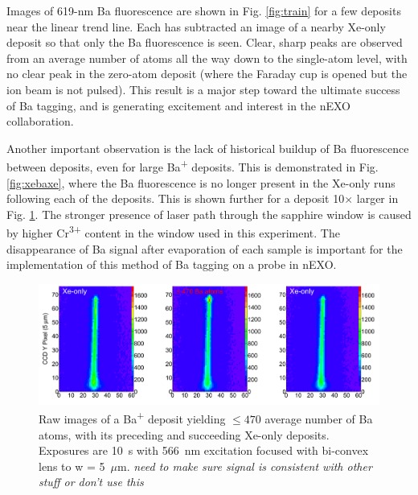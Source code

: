 Images of 619-nm Ba fluorescence are shown in Fig. \ref{fig:train} for a few deposits near the linear trend line.  Each has subtracted an image of a nearby Xe-only deposit so that only the Ba fluorescence is seen.  Clear, sharp peaks are observed from an average number of atoms all the way down to the single-atom level, with no clear peak in the zero-atom deposit (where the Faraday cup is opened but the ion beam is not pulsed).  This result is a major step toward the ultimate success of Ba tagging, and is generating excitement and interest in the nEXO collaboration.

Another important observation is the lack of historical buildup of Ba fluorescence between deposits, even for large Ba\textsuperscript{+} deposits.  This is demonstrated in Fig. \ref{fig:xebaxe}, where the Ba fluorescence is no longer present in the Xe-only runs following each of the deposits.  This is shown further for a deposit 10$\times$ larger in Fig. \ref{fig:xebaxeLarger}.  The stronger presence of laser path through the sapphire window is caused by higher Cr\textsuperscript{3+} content in the window used in this experiment.  The disappearance of Ba signal after evaporation of each sample is important for the implementation of this method of Ba tagging on a probe in nEXO.

\begin{figure} %
        \centering
                \includegraphics[width=.95\textwidth]{figures/xebaxe_larger_average.png}
                \caption{Raw images of a Ba\textsuperscript{+} deposit yielding $\leq 470$ average number of Ba atoms, with its preceding and succeeding Xe-only deposits.  Exposures are 10~s with 566~nm excitation focused with bi-convex lens to w = 5~$\mu$m. \emph{\color{red}need to make sure signal is consistent with other stuff or don't use this}}
\label{fig:xebaxeLarger}
\end{figure}



